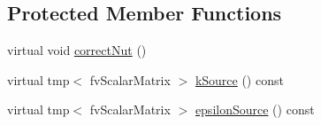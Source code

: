 \subsection*{Protected Member Functions}
\begin{DoxyCompactItemize}
\item 
virtual void \hyperlink{classFoam_1_1RASModels_1_1porousKEpsilon_aaffe89433f18f1ee4137486e19219448}{correct\+Nut} ()
\item 
virtual tmp$<$ fv\+Scalar\+Matrix $>$ \hyperlink{classFoam_1_1RASModels_1_1porousKEpsilon_abd7aa1bd65c38f9773745c8d98a2fed0}{k\+Source} () const
\item 
virtual tmp$<$ fv\+Scalar\+Matrix $>$ \hyperlink{classFoam_1_1RASModels_1_1porousKEpsilon_a11abcc44df285cf748c77aa0a7cac6b8}{epsilon\+Source} () const
\end{DoxyCompactItemize}
